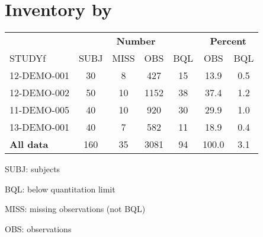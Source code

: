 \documentclass[
]{article}
\newenvironment{Shaded}{\begin{snugshade}}{\end{snugshade}}
\newcommand{\ControlFlowTok}[1]{\textcolor[rgb]{0.13,0.29,0.53}{\textbf{#1}}}
\newcommand{\DataTypeTok}[1]{\textcolor[rgb]{0.13,0.29,0.53}{#1}}
\newcommand{\KeywordTok}[1]{\textcolor[rgb]{0.13,0.29,0.53}{\textbf{#1}}}
\newcommand{\NormalTok}[1]{#1}
\newcommand{\OperatorTok}[1]{\textcolor[rgb]{0.81,0.36,0.00}{\textbf{#1}}}
\newcommand{\StringTok}[1]{\textcolor[rgb]{0.31,0.60,0.02}{#1}}
\begin{document}
\begin{Shaded}
\end{Shaded}

\clearpage

\hypertarget{inventory-by}{%
\section{Inventory by}\label{inventory-by}}

\begin{Shaded}
\end{Shaded}

\begin{table}[h]
\centering
{\def\arraystretch{1.4}\tabcolsep=5pt
\begin{threeparttable}
\begin{tabular}[h]{lcccccc}
\hline
\multicolumn{1}{c}{} & \multicolumn{4}{c}{\textbf{Number}} & \multicolumn{2}{c}{\textbf{Percent}}\\
\cmidrule(lr){2-5}
\cmidrule(lr){6-7}
STUDYf & SUBJ & MISS & OBS & BQL & OBS & BQL \\
\hline
12-DEMO-001 & 30 & 8 & 427 & 15 & 13.9 & 0.5 \\
12-DEMO-002 & 50 & 10 & 1152 & 38 & 37.4 & 1.2 \\
11-DEMO-005 & 40 & 10 & 920 & 30 & 29.9 & 1.0 \\
13-DEMO-001 & 40 & 7 & 582 & 11 & 18.9 & 0.4 \\
\hline \hline {\bf All data} & 160 & 35 & 3081 & 94 & 100.0 & 3.1 \\
\hline
\end{tabular}
\begin{tablenotes}[flushleft]
\item SUBJ: subjects
\item BQL: below quantitation limit
\item MISS: missing observations (not BQL)
\item OBS: observations
\end{tablenotes}
\end{threeparttable}
}
\end{table}
\end{document}
